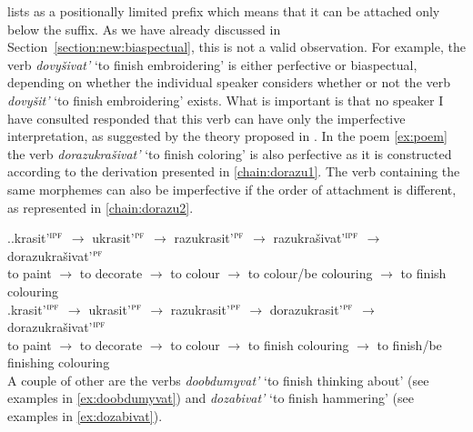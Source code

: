 \citet{Tatevosov:09} lists  as a positionally limited prefix which means that it can be attached only below the  suffix. As we have already discussed in Section~\ref{section:new:biaspectual}, this is not a valid observation. For example, the verb \textit{dovy\v{s}ivat'} `to finish embroidering' is either perfective or biaspectual, depending on whether the individual speaker considers whether or not the verb \textit{dovy\v{s}it'} `to finish embroidering' exists. What is important is that no speaker I have consulted responded that this verb can have only the imperfective interpretation, as suggested by the theory proposed in \citealt{Tatevosov:09}. In the poem \ref{ex:poem} the verb \textit{dorazukra\v{s}ivat'} `to finish coloring' is also perfective as it is constructed according to the derivation presented in \ref{chain:dorazu1}. The verb containing the same morphemes can also be imperfective if the order of attachment is different, as represented in \ref{chain:dorazu2}.

\ex.\ag.\label{chain:dorazu1}krasit'$^{\textsc{ipf}}$ $\rightarrow$ ukrasit'$^{\textsc{pf}}$ $\rightarrow$ razukrasit'$^{\textsc{pf}}$ $\rightarrow$ razukra\v{s}ivat'$^{\textsc{ipf}}$ $\rightarrow$ dorazukra\v{s}ivat'$^{\textsc{pf}}$\\
{to paint} $\rightarrow$ {to decorate} $\rightarrow$ {to colour} $\rightarrow$ {to colour/be colouring} $\rightarrow$ {to finish colouring}\\
\bg.\label{chain:dorazu2}krasit'$^{\textsc{ipf}}$ $\rightarrow$ ukrasit'$^{\textsc{pf}}$ $\rightarrow$ razukrasit'$^{\textsc{pf}}$ $\rightarrow$ dorazukrasit'$^{\textsc{pf}}$ $\rightarrow$ dorazukra\v{s}ivat'$^{\textsc{ipf}}$\\
{to paint} $\rightarrow$ {to decorate} $\rightarrow$ {to colour} $\rightarrow$ {to finish colouring} $\rightarrow$ {to finish/be finishing colouring}\\

A couple of other  are the verbs \textit{doobdumyvat'} `to finish thinking about' (see examples in \ref{ex:doobdumyvat}) and \textit{dozabivat'} `to finish hammering' (see examples in \ref{ex:dozabivat}).

